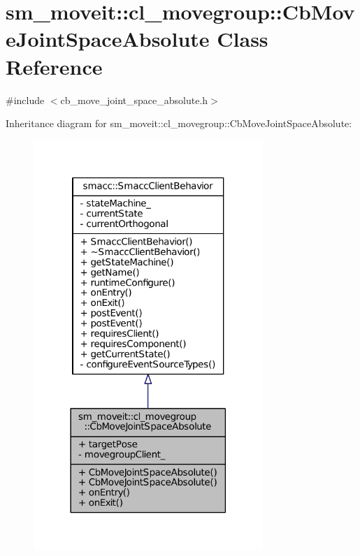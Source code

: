 \hypertarget{classsm__moveit_1_1cl__movegroup_1_1CbMoveJointSpaceAbsolute}{}\section{sm\+\_\+moveit\+:\+:cl\+\_\+movegroup\+:\+:Cb\+Move\+Joint\+Space\+Absolute Class Reference}
\label{classsm__moveit_1_1cl__movegroup_1_1CbMoveJointSpaceAbsolute}


{\ttfamily \#include $<$cb\+\_\+move\+\_\+joint\+\_\+space\+\_\+absolute.\+h$>$}



Inheritance diagram for sm\+\_\+moveit\+:\+:cl\+\_\+movegroup\+:\+:Cb\+Move\+Joint\+Space\+Absolute\+:
\nopagebreak
\begin{figure}[H]
\begin{center}
\leavevmode
\includegraphics[width=246pt]{classsm__moveit_1_1cl__movegroup_1_1CbMoveJointSpaceAbsolute__inherit__graph}
\end{center}
\end{figure}


